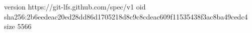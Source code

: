 version https://git-lfs.github.com/spec/v1
oid sha256:2b6eedeac20ed28dd86d1705218d8c9c8cdeac609f11535438f3ac8ba49cedc4
size 5566
